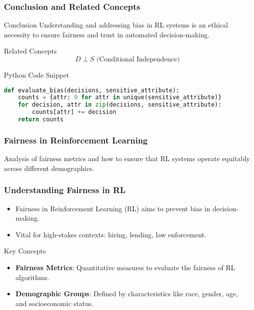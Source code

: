 \documentclass{beamer}
\begin{document}
\begin{frame}[fragile]
    \frametitle{Conclusion and Related Concepts}
    \begin{block}{Conclusion}
        Understanding and addressing bias in RL systems is an ethical necessity to ensure fairness and trust in automated decision-making.
    \end{block}
    
    \begin{block}{Related Concepts}
        \begin{equation}
            D \perp S \text{ (Conditional Independence)}
        \end{equation}
    \end{block}

    \begin{block}{Python Code Snippet}
        \begin{lstlisting}[language=Python]
def evaluate_bias(decisions, sensitive_attribute):
    counts = {attr: 0 for attr in unique(sensitive_attribute)} 
    for decision, attr in zip(decisions, sensitive_attribute):
        counts[attr] += decision
    return counts
        \end{lstlisting}
    \end{block}
\end{frame}

\begin{frame}[fragile]
    \frametitle{Fairness in Reinforcement Learning}
    Analysis of fairness metrics and how to ensure that RL systems operate equitably across different demographics.
\end{frame}

\begin{frame}[fragile]
    \frametitle{Understanding Fairness in RL}
    \begin{itemize}
        \item Fairness in Reinforcement Learning (RL) aims to prevent bias in decision-making.
        \item Vital for high-stakes contexts: hiring, lending, law enforcement.
    \end{itemize}
    \begin{block}{Key Concepts}
        \begin{itemize}
            \item \textbf{Fairness Metrics}: Quantitative measures to evaluate the fairness of RL algorithms.
            \item \textbf{Demographic Groups}: Defined by characteristics like race, gender, age, and socioeconomic status.
        \end{itemize}
    \end{block}
\end{frame}
\end{document}
